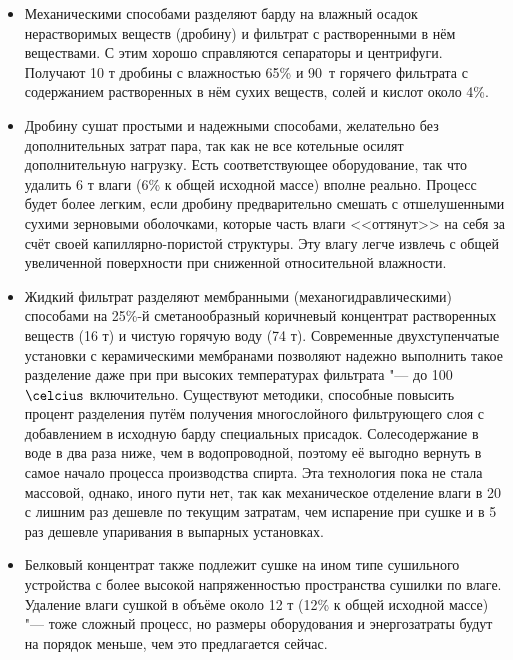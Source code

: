 \begin{itemize} 
\item Механическими способами разделяют барду на влажный осадок нерастворимых веществ (дробину) и фильтрат с растворенными в нём веществами. 
С этим хорошо справляются сепараторы и центрифуги. 
Получают 10 т дробины с влажностью 65\% и 90~т горячего фильтрата с содержанием растворенных в нём сухих веществ, солей и кислот около 4\%. 
\item Дробину сушат простыми и надежными способами, желательно без дополнительных затрат пара, так как не все котельные осилят дополнительную нагрузку. 
Есть соответствующее оборудование, так что удалить 6 т влаги (6\% к общей исходной массе) вполне реально. Процесс будет более легким, если дробину предварительно смешать с отшелушенными сухими зерновыми оболочками, которые часть влаги <<оттянут>> на себя за счёт своей капиллярно-пористой структуры. Эту влагу легче извлечь с общей увеличенной поверхности при сниженной относительной влажности. 
\item Жидкий фильтрат разделяют мембранными (механогидравлическими) способами на 25\%-й сметанообразный коричневый концентрат растворенных веществ (16 т) и чистую горячую воду (74 т). 
Современные двухступенчатые установки с керамическими мембранами позволяют надежно выполнить такое разделение \cite{web_fermenter} даже при при высоких температурах фильтрата "--- до 100$\celcius$ включительно.
Существуют методики, способные повысить процент разделения путём получения многослойного фильтрующего слоя \cite{Makushin_2006_autoref} с добавлением в исходную барду специальных присадок. Солесодержание в воде в два раза ниже, чем в водопроводной, поэтому её выгодно вернуть в самое начало процесса производства спирта. 
Эта технология пока не стала массовой, однако, иного пути нет, так как механическое отделение влаги в 20 с лишним раз дешевле по текущим затратам, чем испарение при сушке и в 5 раз дешевле упаривания в выпарных установках. 
\item Белковый концентрат также подлежит сушке на ином типе сушильного устройства с более высокой напряженностью пространства сушилки по влаге. 
Удаление влаги сушкой в объёме около 12 т (12\% к общей исходной массе) "--- тоже сложный процесс, но размеры оборудования и энергозатраты будут на порядок меньше, чем это предлагается сейчас. 
\end{itemize} 

